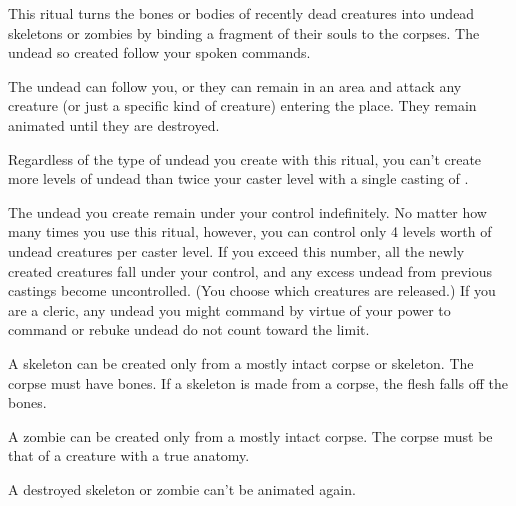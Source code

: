 \begin{spelleffect}
This ritual turns the bones or bodies of recently dead creatures into undead skeletons or zombies by binding a fragment of their souls to the corpses. The undead so created follow your spoken commands.
\par The undead can follow you, or they can remain in an area and attack any creature (or just a specific kind of creature) entering the place. They remain animated until they are destroyed.
\par Regardless of the type of undead you create with this ritual, you can't create more levels of undead than twice your caster level with a single casting of .
\par The undead you create remain under your control indefinitely. No matter how many times you use this ritual, however, you can control only 4 levels worth of undead creatures per caster level. If you exceed this number, all the newly created creatures fall under your control, and any excess undead from previous castings become uncontrolled. (You choose which creatures are released.) If you are a cleric, any undead you might command by virtue of your power to command or rebuke undead do not count toward the limit.
\par {} A skeleton can be created only from a mostly intact corpse or skeleton. The corpse must have bones. If a skeleton is made from a corpse, the flesh falls off the bones.
\par {} A zombie can be created only from a mostly intact corpse. The corpse must be that of a creature with a true anatomy.
\end{spelleffect}
\begin{spellnotes}
A destroyed skeleton or zombie can't be animated again.
\end{spellnotes}


